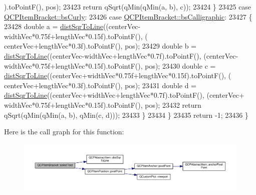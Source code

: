 \begin{DoxyCode}
      ).toPointF(), pos);
23423       \textcolor{keywordflow}{return} qSqrt(qMin(qMin(a, b), c));
23424     \}
23425     \textcolor{keywordflow}{case} \hyperlink{class_q_c_p_item_bracket_a7ac3afd0b24a607054e7212047d59dbda5024ce4023c2d8de4221f1cd4816acd8}{QCPItemBracket::bsCurly}:
23426     \textcolor{keywordflow}{case} \hyperlink{class_q_c_p_item_bracket_a7ac3afd0b24a607054e7212047d59dbda8f29f5ef754e2dc9a9efdedb2face0f3}{QCPItemBracket::bsCalligraphic}:
23427     \{
23428       \textcolor{keywordtype}{double} a = \hyperlink{class_q_c_p_abstract_item_acdca343717d625b8abb3c3e38c0ed39d}{distSqrToLine}((centerVec-widthVec*0.75f+lengthVec*0.15f).toPointF(), (
      centerVec+lengthVec*0.3f).toPointF(), pos);
23429       \textcolor{keywordtype}{double} b = \hyperlink{class_q_c_p_abstract_item_acdca343717d625b8abb3c3e38c0ed39d}{distSqrToLine}((centerVec-widthVec+lengthVec*0.7f).toPointF(), (centerVec-
      widthVec*0.75f+lengthVec*0.15f).toPointF(), pos);
23430       \textcolor{keywordtype}{double} c = \hyperlink{class_q_c_p_abstract_item_acdca343717d625b8abb3c3e38c0ed39d}{distSqrToLine}((centerVec+widthVec*0.75f+lengthVec*0.15f).toPointF(), (
      centerVec+lengthVec*0.3f).toPointF(), pos);
23431       \textcolor{keywordtype}{double} d = \hyperlink{class_q_c_p_abstract_item_acdca343717d625b8abb3c3e38c0ed39d}{distSqrToLine}((centerVec+widthVec+lengthVec*0.7f).toPointF(), (centerVec+
      widthVec*0.75f+lengthVec*0.15f).toPointF(), pos);
23432       \textcolor{keywordflow}{return} qSqrt(qMin(qMin(a, b), qMin(c, d)));
23433     \}
23434   \}
23435   \textcolor{keywordflow}{return} -1;
23436 \}
\end{DoxyCode}


Here is the call graph for this function\+:\nopagebreak
\begin{figure}[H]
\begin{center}
\leavevmode
\includegraphics[width=350pt]{class_q_c_p_item_bracket_aa6933caff1d42c54bcebc769ef88c798_cgraph}
\end{center}
\end{figure}


\hypertarget{class_q_c_p_item_bracket_ac7cfc3da7da9b5c5ac5dfbe4f0351b2a}{}
